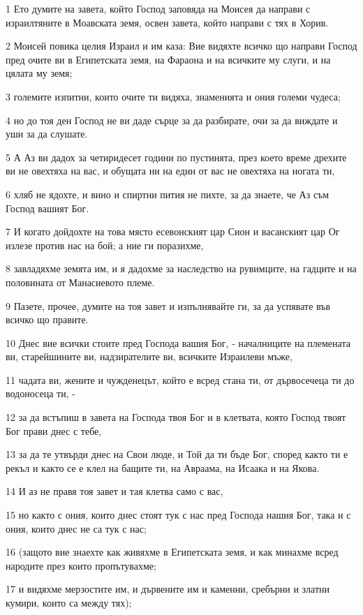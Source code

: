 \par 1 Ето думите на завета, който Господ заповяда на Моисея да направи с израилтяните в Моавската земя, освен завета, който направи с тях в Хорив.
\par 2 Моисей повика целия Израил и им каза: Вие видяхте всичко що направи Господ пред очите ви в Египетската земя, на Фараона и на всичките му слуги, и на цялата му земя;
\par 3 големите изпитни, които очите ти видяха, знаменията и ония големи чудеса;
\par 4 но до тоя ден Господ не ви даде сърце за да разбирате, очи за да виждате и уши за да слушате.
\par 5 А Аз ви дадох за четиридесет години по пустинята, през което време дрехите ви не овехтяха на вас, и обущата ни на един от вас не овехтяха на ногата ти,
\par 6 хляб не ядохте, и вино и спиртни пития не пихте, за да знаете, че Аз съм Господ вашият Бог.
\par 7 И когато дойдохте на това място есевонският цар Сион и васанският цар Ог излезе против нас на бой; а ние ги поразихме,
\par 8 завладяхме земята им, и я дадохме за наследство на рувимците, на гадците и на половината от Манасиевото племе.
\par 9 Пазете, прочее, думите на тоя завет и изпълнявайте ги, за да успявате във всичко що правите.
\par 10 Днес вие всички стоите пред Господа вашия Бог, - началниците на племената ви, старейшините ви, надзирателите ви, всичките Израилеви мъже,
\par 11 чадата ви, жените и чужденецът, който е всред стана ти, от дървосечеца ти до водоносеца ти, -
\par 12 за да встъпиш в завета на Господа твоя Бог и в клетвата, която Господ твоят Бог прави днес с тебе,
\par 13 за да те утвърди днес на Свои люде, и Той да ти бъде Бог, според както ти е рекъл и както се е клел на бащите ти, на Авраама, на Исаака и на Якова.
\par 14 И аз не правя тоя завет и тая клетва само с вас,
\par 15 но както с ония, които днес стоят тук с нас пред Господа нашия Бог, така и с ония, които днес не са тук с нас;
\par 16 (защото вие знаехте как живяхме в Египетската земя, и как минахме всред народите през които пропътувахме;
\par 17 и видяхме мерзостите им, и дървените им и каменни, сребърни и златни кумири, които са между тях);
